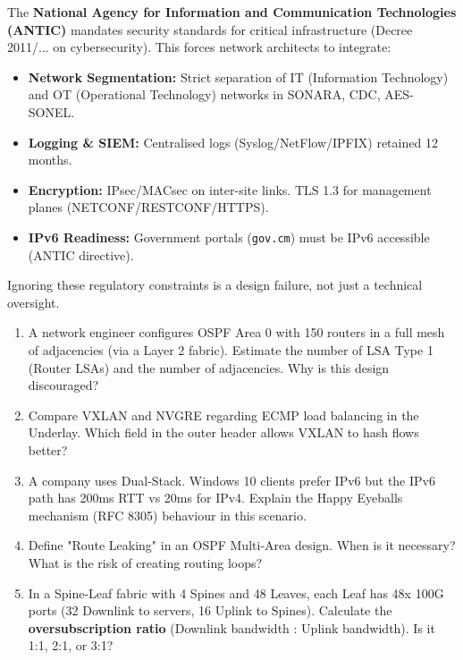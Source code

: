 \documentclass[11pt]{article}
\begin{document}
\begin{savaistu}
The \textbf{National Agency for Information and Communication Technologies (ANTIC)} mandates security standards for critical infrastructure (Decree 2011/... on cybersecurity). This forces network architects to integrate:
\begin{itemize}
\item \textbf{Network Segmentation:} Strict separation of IT (Information Technology) and OT (Operational Technology) networks in SONARA, CDC, AES-SONEL.
\item \textbf{Logging \& SIEM:} Centralised logs (Syslog/NetFlow/IPFIX) retained 12 months.
\item \textbf{Encryption:} IPsec/MACsec on inter-site links. TLS 1.3 for management planes (NETCONF/RESTCONF/HTTPS).
\item \textbf{IPv6 Readiness:} Government portals (\texttt{gov.cm}) must be IPv6 accessible (ANTIC directive).
\end{itemize}
Ignoring these regulatory constraints is a design failure, not just a technical oversight.
\end{savaistu}

\begin{exercice}
\begin{enumerate}
\item A network engineer configures OSPF Area 0 with 150 routers in a full mesh of adjacencies (via a Layer 2 fabric). Estimate the number of LSA Type 1 (Router LSAs) and the number of adjacencies. Why is this design discouraged?
\item Compare VXLAN and NVGRE regarding ECMP load balancing in the Underlay. Which field in the outer header allows VXLAN to hash flows better?
\item A company uses Dual-Stack. Windows 10 clients prefer IPv6 but the IPv6 path has 200ms RTT vs 20ms for IPv4. Explain the Happy Eyeballs mechanism (RFC 8305) behaviour in this scenario.
\item Define "Route Leaking" in an OSPF Multi-Area design. When is it necessary? What is the risk of creating routing loops?
\item In a Spine-Leaf fabric with 4 Spines and 48 Leaves, each Leaf has 48x 100G ports (32 Downlink to servers, 16 Uplink to Spines). Calculate the \textbf{oversubscription ratio} (Downlink bandwidth : Uplink bandwidth). Is it 1:1, 2:1, or 3:1?
\end{enumerate}
\end{exercice}
\end{document}
